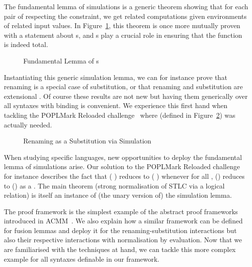 The fundamental lemma of simulations is a generic theorem showing that for
each pair of \semrec{} respecting the  constraint, we
get related computations given environments of related input values.
In Figure~\ref{defn:Simulation}, this theorem is once more mutually
proven with a statement about s,
and s play a crucial role in ensuring that the function is indeed total.

\begin{figure}[h]
\caption{Fundamental Lemma of s\label{defn:Simulation}}
\end{figure}

Instantiating this generic simulation lemma, we can for instance prove
that renaming is a special case of substitution, or that renaming and
substitution are extensional . Of course these
results are not new but having them generically over all syntaxes with
binding is convenient. We experience this first hand when tackling the
POPLMark Reloaded challenge~\citeyear{poplmarkreloaded} where
 (defined in Figure~\ref{defn:RenSub}) was actually needed.

\begin{figure}[h]
\caption{Renaming as a Substitution via Simulation\label{defn:RenSub}}
\end{figure}

When studying specific languages, new opportunities to deploy the
fundamental lemma of simulations arise. Our solution to the POPLMark
Reloaded challenge for instance describes the fact that
{( \AB{$\rho$} )}
reduces to {(  )} whenever for all ,
\AB{$\rho$}() reduces to () as a .
The main theorem (strong normalisation of STLC via a logical relation)
is itself an instance of (the unary version of) the simulation lemma.

The  proof framework is the simplest example of the abstract
proof frameworks introduced in ACMM~\citeyear{allais2017type}. We also
explain how a similar framework can be defined
for fusion lemmas and deploy it for the renaming-substitution interactions
but also their respective interactions with normalisation by evaluation.
Now that we are familiarised with the techniques at hand, we can tackle
this more complex example for all syntaxes definable in our framework.


